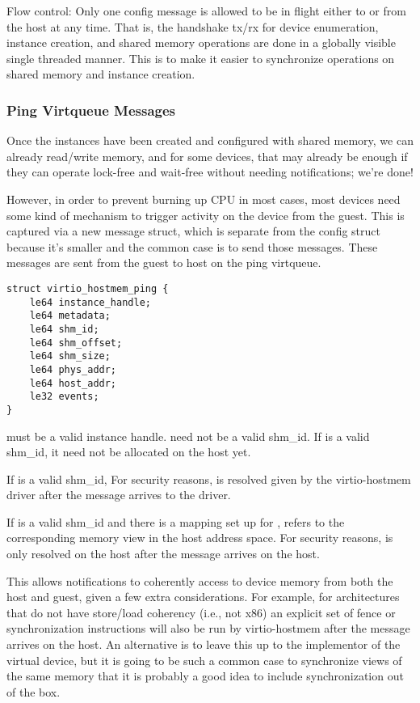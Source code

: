Flow control: Only one config message is allowed to be in flight
either to or from the host at any time.
That is, the handshake tx/rx for device enumeration, instance creation, and shared memory operations
are done in a globally visible single threaded manner.
This is to make it easier to synchronize operations on shared memory and instance creation.

\subsubsection{Ping Virtqueue Messages}\label{sec:Device Types / Host Memory Device / Device Operation / Ping Virtqueue Messages}

Once the instances have been created and configured with shared memory,
we can already read/write memory, and for some devices, that may already be enough
if they can operate lock-free and wait-free without needing notifications; we're done!

However, in order to prevent burning up CPU in most cases,
most devices need some kind of mechanism to trigger activity on the device
from the guest. This is captured via a new message struct,
which is separate from the config struct because it's smaller and
the common case is to send those messages.
These messages are sent from the guest to host
on the ping virtqueue.

\begin{lstlisting}
struct virtio_hostmem_ping {
    le64 instance_handle;
    le64 metadata;
    le64 shm_id;
    le64 shm_offset;
    le64 shm_size;
    le64 phys_addr;
    le64 host_addr;
    le32 events;
}
\end{lstlisting}

 must be a valid instance handle.
 need not be a valid shm_id.
If  is a valid shm_id,
it need not be allocated on the host yet.

If  is a valid shm_id,
For security reasons,
 is resolved given  by
the virtio-hostmem driver after the message arrives to the driver.

If  is a valid shm_id
and there is a mapping set up for ,
 refers to the corresponding memory view in the host address space.
For security reasons,
 is only resolved on the host after the message arrives on the host.

This allows notifications to coherently access to device memory
from both the host and guest, given a few extra considerations.
For example, for architectures that do not have store/load coherency (i.e., not x86)
an explicit set of fence or synchronization instructions will also be run by virtio-hostmem
after the message arrives on the host.
An alternative is to leave this up to the implementor of the virtual device,
but it is going to be such a common case to synchronize views of the same memory
that it is probably a good idea to include synchronization out of the box.

